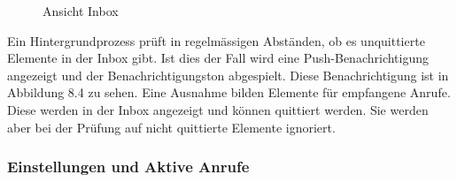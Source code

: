 \begin{figure}[h]
\begin{minipage}[b]{0.45\textwidth}
        \caption{Ansicht Inbox}
    \end{minipage}
    \label{fig:MobileClient-Screens2}
\end{figure}

Ein Hintergrundprozess prüft in regelmässigen Abständen, ob es unquittierte Elemente in der Inbox gibt.
Ist dies der Fall wird eine Push-Benachrichtigung angezeigt und der Benachrichtigungston abgespielt.
Diese Benachrichtigung ist in Abbildung 8.4 zu sehen.
Eine Ausnahme bilden Elemente für empfangene Anrufe.
Diese werden in der Inbox angezeigt und können quittiert werden.
Sie werden aber bei der Prüfung auf nicht quittierte Elemente ignoriert.

\clearpage

\subsubsection*{Einstellungen und Aktive Anrufe}

